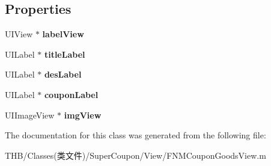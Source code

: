 \subsection*{Properties}
\begin{DoxyCompactItemize}
\item 
\mbox{\label{interface_f_n_m_coupon_goods_sub_view_ac3d7dfe46d463025bbe42e8471520e97}} 
U\+I\+View $\ast$ {\bfseries label\+View}
\item 
\mbox{\label{interface_f_n_m_coupon_goods_sub_view_a5a150de87a8511173c97443ef6bba212}} 
U\+I\+Label $\ast$ {\bfseries title\+Label}
\item 
\mbox{\label{interface_f_n_m_coupon_goods_sub_view_a6490cd302bdc0d7f010de8338b5e9eaa}} 
U\+I\+Label $\ast$ {\bfseries des\+Label}
\item 
\mbox{\label{interface_f_n_m_coupon_goods_sub_view_a5a8c5d5bec4006a89c83a629e97a2c60}} 
U\+I\+Label $\ast$ {\bfseries coupon\+Label}
\item 
\mbox{\label{interface_f_n_m_coupon_goods_sub_view_a18eec805d0792da7a8be025596850815}} 
U\+I\+Image\+View $\ast$ {\bfseries img\+View}
\end{DoxyCompactItemize}


The documentation for this class was generated from the following file\+:\begin{DoxyCompactItemize}
\item 
T\+H\+B/\+Classes(类文件)/\+Super\+Coupon/\+View/F\+N\+M\+Coupon\+Goods\+View.\+m\end{DoxyCompactItemize}
